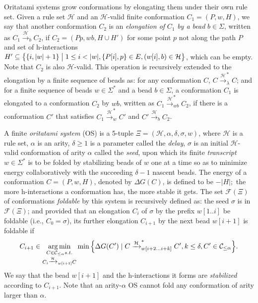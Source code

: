 Oritatami systems grow conformations by elongating them under their own rule set. 
Given a rule set $\mathcal{H}$ and an $\mathcal{H}$-valid finite conformation $C_1 = (P, w, H)$, 
we say that another conformation $C_2$ is an \textit{elongation of} $C_1$ \textit{by a bead} $b \in \Sigma$, written as $C_1 \xrightarrow{\mathcal{H}}_b C_2$, if $C_2 = (Pp, wb, H \cup H')$ for some point $p$ not along the path $P$ and set of h-interactions $H' \subseteq \left\{ \{i, |w|+1\} \bigm| 1\leq i < |w|, \{P[i], p\} \in E, (w[i], b) \in \mathcal{H}\right\}$, which can be empty.
Note that $C_2$ is also $\mathcal{H}$-valid.
This operation is recursively extended to the elongation by a finite sequence of beads as: 
for any conformation $C$, $C \xrightarrow{\mathcal{H}}^*_\lambda C$; 
and for a finite sequence of beads $w \in \Sigma^*$ and a bead $b \in \Sigma$,
a conformation $C_1$ is elongated to a conformation $C_2$ by $wb$,
written as $C_1 \xrightarrow{\mathcal{H}}^*_{wb} C_2$, if there is a conformation $C'$ that satisfies
$C_1 \xrightarrow{\mathcal{H}}^*_w C'$ and $C' \xrightarrow{\mathcal{H}}_b C_2$.

A finite \textit{oritatami system} (OS) is a 5-tuple $\Xi = (\mathcal{H}, \alpha, \delta, \sigma,w)$, where 
$\mathcal{H}$ is a rule set,
$\alpha$ is an arity, 
$\delta \geq 1$ is a parameter called the \textit{delay}, 
$\sigma$ is an initial $\mathcal{H}$-valid conformation of arity $\alpha$ called the \textit{seed}, upon which its finite \textit{transcript} $w \in \Sigma^*$ is to be folded by stabilizing beads of $w$ one at a time so as to minimize energy collaboratively with the succeeding $\delta -1$ nascent beads. 
The energy of a conformation $C = (P, w, H)$, denoted by $\Delta G(C)$, is defined to be $-|H|;$ the more h-interactions a conformation has, the more stable it gets.
The set $\mathcal{F}(\Xi)$ of conformations \textit{foldable} by this system is recursively defined as: 
the seed $\sigma$ is in $\mathcal{F}(\Xi)$; and provided that an elongation $C_{i}$ of $\sigma$ by the prefix $w[1..i]$ be foldable (i.e., $C_0 = \sigma$), its further elongation $C_{i+1}$ by the next bead $w[i+1]$ is foldable if
\begin{equation}\label{eq:cotranscriptional_folding}
C_{i+1} \in \operatorname*{arg\,min}_{
\substack{
C \in \mathcal{C}_{\le \alpha} s.t. \\
C_i \xrightarrow{\mathcal{H}}_{w[i+1]}C \\
}
}
\min \Big\{ \Delta G(C') \mid 
C \xrightarrow{\mathcal{H}}^*_{w[i+2...i+k]}C', k\le \delta, C' \in \mathcal{C}_{\le \alpha}
\Big\}.
\end{equation}
We say that the bead $w[i+1]$ and the h-interactions it forms are \textit{stabilized} according to $C_{i+1}$.
Note that an arity-$\alpha$ OS cannot fold any conformation of arity larger than $\alpha$.

